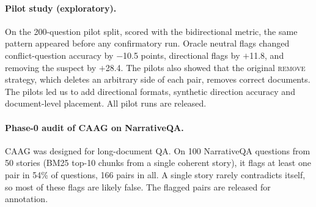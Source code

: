 \paragraph{Pilot study (exploratory).}
On the 200-question pilot split, scored with the bidirectional metric, the same pattern appeared before any
confirmatory run. Oracle neutral flags changed conflict-question accuracy by $-$10.5 points, directional flags by
$+$11.8, and removing the suspect by $+$28.4. The pilots also showed that the original \textsc{remove} strategy,
which deletes an arbitrary side of each pair, removes correct documents. The pilots led us to add directional formats,
synthetic direction accuracy and document-level placement. All pilot runs are released.

\paragraph{Phase-0 audit of CAAG on NarrativeQA.}
CAAG was designed for long-document QA. On 100 NarrativeQA \citep{kocisky2018narrativeqa} questions from 50 stories
(BM25 top-10 chunks from a single coherent story), it flags at least one pair in 54\% of questions, 166 pairs in all.
A single story rarely contradicts itself, so most of these flags are likely false. The flagged pairs are released for annotation.
